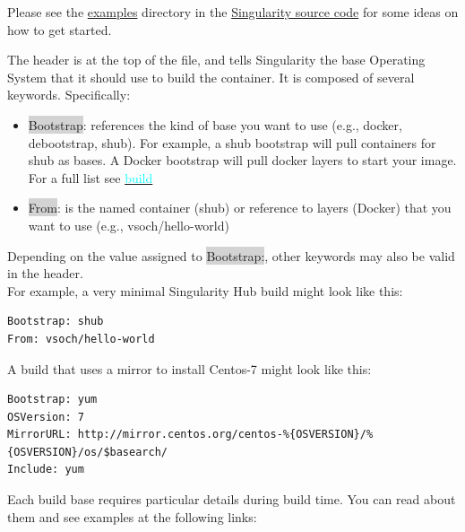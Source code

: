 \documentclass[a4paper]{article}
\newcounter{subsubsubsection}[subsubsection]
\begin{document}
Please see the \href{https://github.com/singularityware/singularity/tree/master/examples}{examples} directory in the \href{https://github.com/singularityware/singularity}{Singularity source code} for some ideas on how to get started.\\[0.1in]

	
	The header is at the top of the file, and tells Singularity the base Operating System that it should use to build the container. It is composed of several keywords. Specifically:
	
	\begin{itemize}
	\item \colorbox{lightgray}{Bootstrap}: references the kind of base you want to use (e.g., docker, debootstrap, shub). For example, a shub bootstrap will pull containers for shub as bases. A Docker bootstrap will pull docker layers to start your image. For a full list see \hyperref[sec:buildcontainer]{{\textcolor{cyan}{build}}} 
	\item \colorbox{lightgray}{From}: is the named container (shub) or reference to layers (Docker) that you want to use (e.g., vsoch/hello-world)
	\end{itemize}
	
Depending on the value assigned to \colorbox{lightgray}{Bootstrap:}, other keywords may also be valid in the header.
\\[0.1in]
For example, a very minimal Singularity Hub build might look like this:

\begin{lstlisting}[frame=single] 
Bootstrap: shub
From: vsoch/hello-world 
\end{lstlisting}

A build that uses a mirror to install Centos-7 might look like this:
	

\begin{lstlisting}[frame=single] 
Bootstrap: yum
OSVersion: 7
MirrorURL: http://mirror.centos.org/centos-%{OSVERSION}/%{OSVERSION}/os/$basearch/
Include: yum
\end{lstlisting}
	
	
	Each build base requires particular details during build time. You can read about them and see examples at the following links:\\[0.1in]
	
\end{document}
